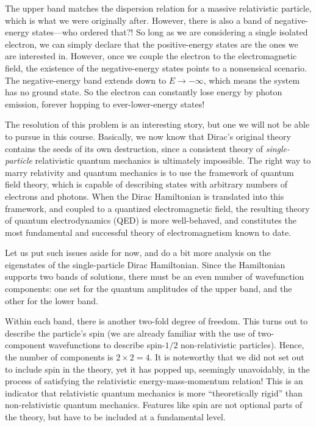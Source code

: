 \documentclass[pra,12pt]{revtex4}
\begin{document}
The upper band matches the dispersion relation for a massive
relativistic particle, which is what we were originally after.
However, there is also a band of negative-energy states---who ordered
that?!  So long as we are considering a single isolated electron, we
can simply declare that the positive-energy states are the ones we are
interested in.  However, once we couple the electron to the
electromagnetic field, the existence of the negative-energy states
points to a nonsensical scenario.  The negative-energy band extends
down to $E \rightarrow -\infty$, which means the system has no ground
state.  So the electron can constantly lose energy by photon emission,
forever hopping to ever-lower-energy states!

The resolution of this problem is an interesting story, but one we
will not be able to pursue in this course.  Basically, we now know
that Dirac's original theory contains the seeds of its own
destruction, since a consistent theory of \textit{single-particle}
relativistic quantum mechanics is ultimately impossible.  The right
way to marry relativity and quantum mechanics is to use the framework
of quantum field theory, which is capable of describing states with
arbitrary numbers of electrons and photons.  When the Dirac
Hamiltonian is translated into this framework, and coupled to a
quantized electromagnetic field, the resulting theory of quantum
electrodynamics (QED) is more well-behaved, and constitutes the most
fundamental and successful theory of electromagnetism known to date.

Let us put such issues aside for now, and do a bit more analysis on
the eigenstates of the single-particle Dirac Hamiltonian.  Since the
Hamiltonian supports two bands of solutions, there must be an even
number of wavefunction components: one set for the quantum amplitudes
of the upper band, and the other for the lower band.

Within each band, there is another two-fold degree of freedom.  This
turns out to describe the particle's spin (we are already familiar
with the use of two-component wavefunctions to describe spin-$1/2$
non-relativistic particles).  Hence, the number of components is
$2\times2 = 4$.  It is noteworthy that we did not set out to include
spin in the theory, yet it has popped up, seemingly unavoidably, in
the process of satisfying the relativistic energy-mass-momentum
relation!  This is an indicator that relativistic quantum mechanics is
more ``theoretically rigid'' than non-relativistic quantum mechanics.
Features like spin are not optional parts of the theory, but have to
be included at a fundamental level.
\end{document}
